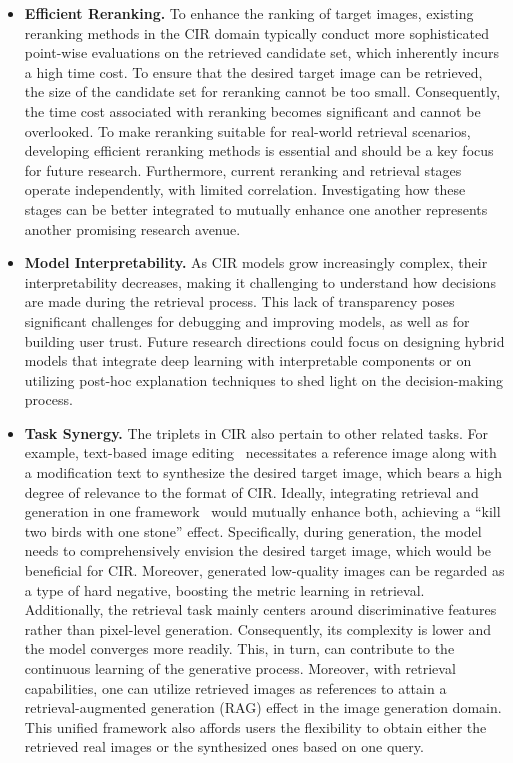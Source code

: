 \begin{itemize}
    \item \textbf{Efficient Reranking.} To enhance the ranking of target images, existing reranking methods in the CIR domain typically conduct more sophisticated point-wise evaluations on the retrieved candidate set, which inherently incurs a high time cost. To ensure that the desired target image can be retrieved, the size of the candidate set for reranking cannot be too small. Consequently, the time cost associated with reranking becomes significant and cannot be overlooked. To make reranking suitable for real-world retrieval scenarios, developing efficient reranking methods is essential and should be a key focus for future research. Furthermore, current reranking and retrieval stages operate independently, with limited correlation. Investigating how these stages can be better integrated to mutually enhance one another represents another promising research avenue.
     \item \textbf{Model Interpretability.} As CIR models grow increasingly complex, their interpretability decreases, making it challenging to understand how decisions are made during the retrieval process. This lack of transparency poses significant challenges for debugging and improving models, as well as for building user trust. Future research directions could focus on designing hybrid models that integrate deep learning with interpretable components or on utilizing post-hoc explanation techniques to shed light on the decision-making process. 
     \item \textbf{Task Synergy.} The triplets in CIR also pertain to other related tasks. For example, text-based image editing~\cite{imageediting1, imageediting2} necessitates a reference image along with a modification text to synthesize the desired target image, which bears a high degree of relevance to the format of CIR. Ideally, integrating retrieval and generation in one framework~\cite{unifashion} would mutually enhance both, achieving a ``kill two birds with one stone'' effect. Specifically, during generation, the model needs to comprehensively envision the desired target image, which would be beneficial for CIR. Moreover, generated low-quality images can be regarded as a type of hard negative, boosting the metric learning in retrieval. Additionally, the retrieval task mainly centers around discriminative features rather than pixel-level generation. Consequently, its complexity is lower and the model converges more readily. This, in turn, can contribute to the continuous learning of the generative process. Moreover, with retrieval capabilities, one can utilize retrieved images as references to attain a retrieval-augmented generation (RAG) effect in the image generation domain. This unified framework also affords users the flexibility to obtain either the retrieved real images or the synthesized ones based on one query. 
\end{itemize}

